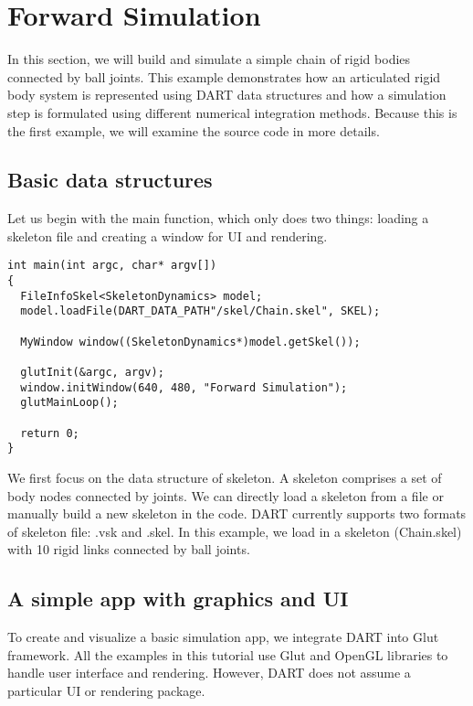 \section{Forward Simulation}
In this section, we will build and simulate a simple chain of rigid
bodies connected by ball joints. This example demonstrates how an
articulated rigid body system is represented using DART data
structures and how a simulation step is formulated using different
numerical integration methods. Because this is the first example, we
will examine the source code in more details.

\subsection{Basic data structures}
Let us begin with the main function, which only does two things:
loading a skeleton file and creating a window for UI and rendering. 

\ttfamily
\begin{lstlisting}[caption=Main.cpp]
int main(int argc, char* argv[])
{
  FileInfoSkel<SkeletonDynamics> model;
  model.loadFile(DART_DATA_PATH"/skel/Chain.skel", SKEL);

  MyWindow window((SkeletonDynamics*)model.getSkel());
  
  glutInit(&argc, argv);
  window.initWindow(640, 480, "Forward Simulation");
  glutMainLoop();

  return 0;
}
\end{lstlisting}
\rmfamily 

We first focus on the data structure of skeleton. A skeleton comprises
a set of body nodes connected by joints. We can directly load a
skeleton from a file or manually build a new skeleton in the
code. DART currently supports two formats of skeleton file: .vsk and
.skel. In this example, we load in a skeleton (Chain.skel) with 10
rigid links connected by ball joints.


\subsection{A simple app with graphics and UI}
To create and visualize a basic simulation app, we integrate DART into
Glut framework. All the examples in this tutorial use Glut and OpenGL
libraries to handle user interface and rendering. However, DART does
not assume a particular UI or rendering package.

